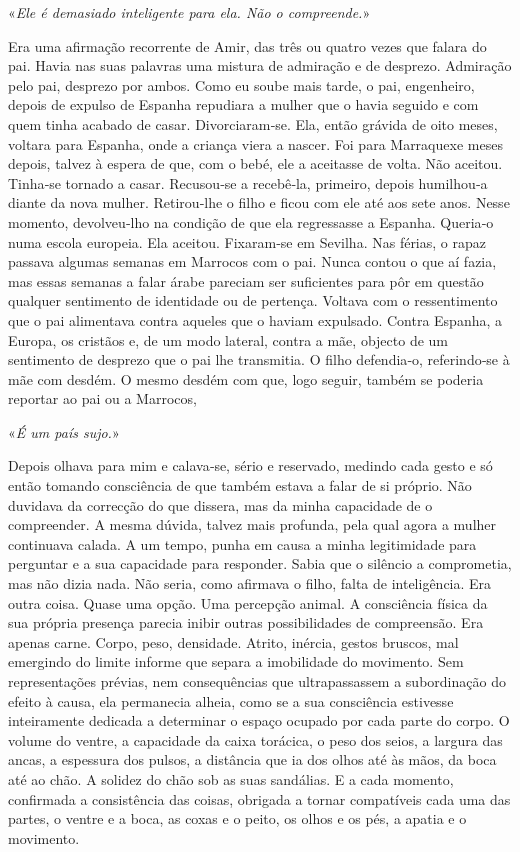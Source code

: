 «\emph{Ele é demasiado inteligente para ela. Não o compreende.}»

Era uma afirmação recorrente de Amir, das três ou quatro vezes que
falara do pai. Havia nas suas palavras uma mistura de admiração e de
desprezo. Admiração pelo pai, desprezo por ambos. Como eu soube mais
tarde, o pai, engenheiro, depois de expulso de Espanha repudiara a
mulher que o havia seguido e com quem tinha acabado de casar.
Divorciaram­‑se. Ela, então grávida de oito meses, voltara para Espanha,
onde a criança viera a nascer. Foi para Marraquexe meses depois, talvez
à espera de que, com o bebé, ele a aceitasse de volta. Não aceitou.
Tinha­‑se tornado a casar. Recusou­‑se a recebê­‑la, primeiro, depois
humilhou­‑a diante da nova mulher. Retirou­‑lhe o filho e ficou com ele
até aos sete anos. Nesse momento, devolveu­‑lho na condição de que ela
regressasse a Espanha. Queria­‑o numa escola europeia. Ela aceitou.
Fixaram­‑se em Sevilha. Nas férias, o rapaz passava algumas semanas em
Marrocos com o pai. Nunca contou o que aí fazia, mas essas semanas a
falar árabe pareciam ser suficientes para pôr em questão qualquer
sentimento de identidade ou de pertença. Voltava com o ressentimento que
o pai alimentava contra aqueles que o haviam expulsado. Contra Espanha,
a Europa, os cristãos e, de um modo lateral, contra a mãe, objecto de um
sentimento de desprezo que o pai lhe transmitia. O filho defendia­‑o,
referindo­‑se à mãe com desdém. O mesmo desdém com que, logo seguir,
também se poderia reportar ao pai ou a Marrocos,

«\emph{É um país sujo.}»

Depois olhava para mim e calava­‑se, sério e reservado, medindo cada
gesto e só então tomando consciência de que também estava a falar de si
próprio. Não duvidava da correcção do que dissera, mas da minha
capacidade de o compreender. A mesma dúvida, talvez mais profunda, pela
qual agora a mulher continuava calada. A um tempo, punha em causa a
minha legitimidade para perguntar e a sua capacidade para responder.
Sabia que o silêncio a comprometia, mas não dizia nada. Não seria, como
afirmava o filho, falta de inteligência. Era outra coisa. Quase uma
opção. Uma percepção animal. A consciência física da sua própria
presença parecia inibir outras possibilidades de compreensão. Era apenas
carne. Corpo, peso, densidade. Atrito, inércia, gestos bruscos, mal
emergindo do limite informe que separa a imobilidade do movimento. Sem
representações prévias, nem consequências que ultrapassassem a
subordinação do efeito à causa, ela permanecia alheia, como se a sua
consciência estivesse inteiramente dedicada a determinar o espaço
ocupado por cada parte do corpo. O volume do ventre, a capacidade da
caixa torácica, o peso dos seios, a largura das ancas, a espessura dos
pulsos, a distância que ia dos olhos até às mãos, da boca até ao chão. A
solidez do chão sob as suas sandálias. E a cada momento, confirmada a
consistência das coisas, obrigada a tornar compatíveis cada uma das
partes, o ventre e a boca, as coxas e o peito, os olhos e os pés, a
apatia e o movimento.

